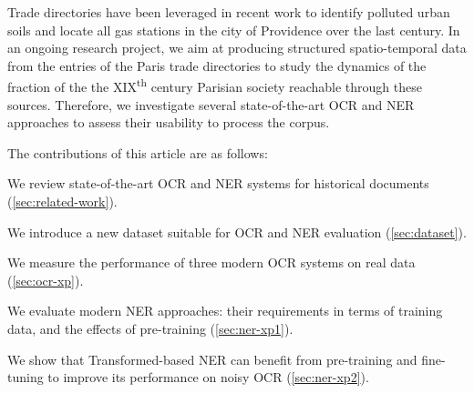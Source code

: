 Trade directories have been leveraged in recent work to identify polluted urban soils \cite{bell2020automated} and locate all gas stations in the city of Providence over the last century.
In an ongoing research project, we aim at producing structured spatio-temporal data from the entries of the Paris trade directories to study the dynamics of the fraction of the the XIX\textsuperscript{th} century Parisian society reachable through these sources.
Therefore, we investigate several state-of-the-art OCR and NER approaches to assess their usability to process the corpus.

The contributions of this article are as follows:
\begin{enumerate*}[(i)]
    \item We review state-of-the-art OCR and NER systems for historical documents (\cref{sec:related-work}).
    \item We introduce a new dataset suitable for OCR and NER evaluation (\cref{sec:dataset}).
    \item We measure the performance of three modern OCR systems on real data (\cref{sec:ocr-xp}).
    \item We evaluate modern NER approaches: their requirements in terms of training data, and the effects of pre-training (\cref{sec:ner-xp1}).
    \item We show that Transformed-based NER can benefit from pre-training and fine-tuning to improve its performance on noisy OCR (\cref{sec:ner-xp2}).
\end{enumerate*}


